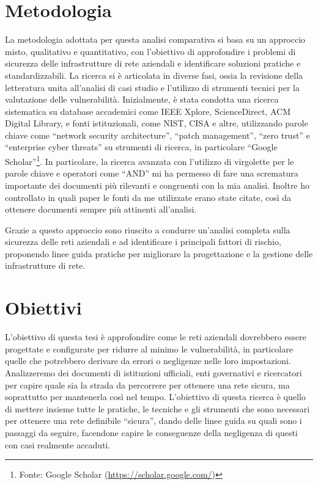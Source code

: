 
\newpage
    \section{Metodologia}
        La metodologia adottata per questa analisi comparativa si basa su un approccio 
        misto, qualitativo e quantitativo, con l'obiettivo di approfondire i problemi di 
        sicurezza delle infrastrutture di rete aziendali e identificare soluzioni pratiche 
        e standardizzabili. La ricerca si è articolata in diverse fasi, ossia la revisione 
        della letteratura unita all'analisi di casi studio e l'utilizzo di strumenti 
        tecnici per la valutazione delle vulnerabilità. Inizialmente, è stata condotta una ricerca sistematica su database accademici come IEEE Xplore, ScienceDirect, ACM Digital Library, e fonti istituzionali, come NIST, CISA e altre, utilizzando parole chiave come “network security architecture”, “patch management”, “zero trust” e “enterprise cyber threats” su strumenti di ricerca, in particolare “Google Scholar”\footnote{Fonte: Google Scholar (\url{https://scholar.google.com/})}. 
        In particolare, la ricerca avanzata con l'utilizzo di virgolette per le parole chiave e operatori come “AND” mi ha permesso di fare una scrematura importante dei documenti più rilevanti e congruenti con la mia analisi. Inoltre ho controllato in quali paper le fonti da me utilizzate erano state citate, così da ottenere documenti sempre più attinenti all'analisi.

            

        Grazie a questo approccio sono riuscito a condurre un'analisi completa sulla sicurezza delle reti aziendali e ad identificare i principali fattori di rischio, proponendo linee guida pratiche per migliorare la progettazione e la gestione delle infrastrutture di rete.

    \section{Obiettivi}
        L'obiettivo di questa tesi è approfondire come le reti aziendali dovrebbero essere progettate e configurate per ridurre al minimo le vulnerabilità, in particolare quelle che potrebbero derivare da errori o negligenze nelle loro impostazioni. Analizzeremo dei documenti di istituzioni ufficiali, enti governativi e ricercatori per capire quale sia la strada da percorrere per ottenere una rete sicura, ma soprattutto per mantenerla così nel tempo.
        L'obiettivo di questa ricerca è quello di mettere insieme tutte le pratiche, le tecniche e gli strumenti che sono necessari per ottenere una rete definibile “sicura”, dando delle linee guida su quali sono i passaggi da seguire, facendone capire le conseguenze della negligenza di questi con casi realmente accaduti.